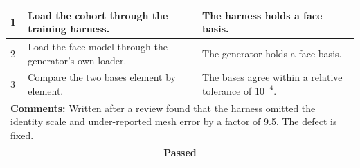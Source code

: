 \begin{table}[H]
\begin{tabular}{|llll|}
\multicolumn{1}{|l|}{1} & \multicolumn{1}{P{5.6cm}|}{Load the cohort through the training harness.} & \multicolumn{2}{P{6.3cm}|}{The harness holds a face basis.} \\ \hline
\multicolumn{1}{|l|}{2} & \multicolumn{1}{P{5.6cm}|}{Load the face model through the generator's own loader.} & \multicolumn{2}{P{6.3cm}|}{The generator holds a face basis.} \\ \hline
\multicolumn{1}{|l|}{3} & \multicolumn{1}{P{5.6cm}|}{Compare the two bases element by element.} & \multicolumn{2}{P{6.3cm}|}{The bases agree within a relative tolerance of $10^{-4}$.} \\ \hline
\multicolumn{4}{|P{15.2cm}|}{\textbf{Comments:} Written after a review found that the harness omitted the identity scale and under-reported mesh error by a factor of 9.5. The defect is fixed.} \\ \hline
\multicolumn{4}{|c|}{\textbf{Passed}} \\ \hline
\end{tabular}
\end{table}

